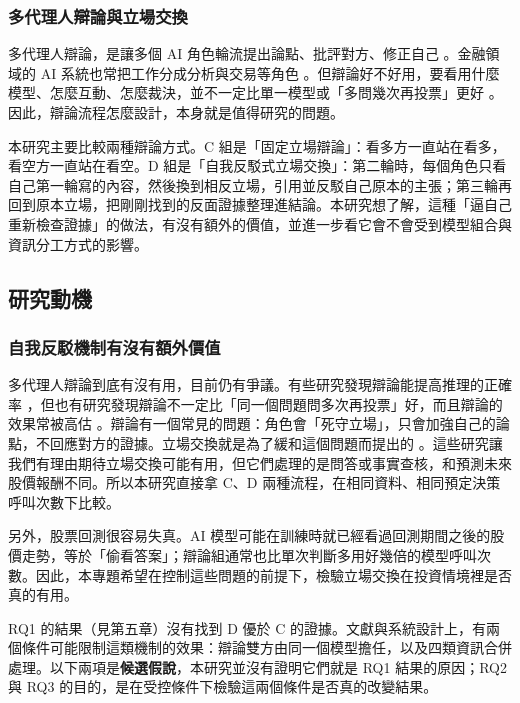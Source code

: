 \documentclass[12pt,a4paper]{article}
\numberwithin{table}{section}
\numberwithin{figure}{section}
\begin{document}
\subsubsection{多代理人辯論與立場交換}
多代理人辯論，是讓多個 AI 角色輪流提出論點、批評對方、修正自己 \citep{du2023debate,liang2023divergent}。金融領域的 AI 系統也常把工作分成分析與交易等角色 \citep{xiao2024tradingagents,zhang2024stockagent}。但辯論好不好用，要看用什麼模型、怎麼互動、怎麼裁決，並不一定比單一模型或「多問幾次再投票」更好 \citep{smit2023mad,zhang2025stop}。因此，辯論流程怎麼設計，本身就是值得研究的問題。

本研究主要比較兩種辯論方式。C 組是「固定立場辯論」：看多方一直站在看多，看空方一直站在看空。D 組是「自我反駁式立場交換」：第二輪時，每個角色只看自己第一輪寫的內容，然後換到相反立場，引用並反駁自己原本的主張；第三輪再回到原本立場，把剛剛找到的反面證據整理進結論。本研究想了解，這種「逼自己重新檢查證據」的做法，有沒有額外的價值，並進一步看它會不會受到模型組合與資訊分工方式的影響。

\subsection{研究動機}

\subsubsection{自我反駁機制有沒有額外價值}
多代理人辯論到底有沒有用，目前仍有爭議。有些研究發現辯論能提高推理的正確率 \citep{du2023debate}，但也有研究發現辯論不一定比「同一個問題問多次再投票」好，而且辯論的效果常被高估 \citep{smit2023mad,zhang2025stop}。辯論有一個常見的問題：角色會「死守立場」，只會加強自己的論點，不回應對方的證據。立場交換就是為了緩和這個問題而提出的 \citep{liu2025roleswitch,chowdhury2026proclaim}。這些研究讓我們有理由期待立場交換可能有用，但它們處理的是問答或事實查核，和預測未來股價報酬不同。所以本研究直接拿 C、D 兩種流程，在相同資料、相同預定決策呼叫次數下比較。

另外，股票回測很容易失真。AI 模型可能在訓練時就已經看過回測期間之後的股價走勢，等於「偷看答案」\citep{glasserman2023lookahead,kong2026bias}；辯論組通常也比單次判斷多用好幾倍的模型呼叫次數。因此，本專題希望在控制這些問題的前提下，檢驗立場交換在投資情境裡是否真的有用。

RQ1 的結果（見第五章）沒有找到 D 優於 C 的證據。文獻與系統設計上，有兩個條件可能限制這類機制的效果：辯論雙方由同一個模型擔任，以及四類資訊合併處理。以下兩項是\textbf{候選假說}，本研究並沒有證明它們就是 RQ1 結果的原因；RQ2 與 RQ3 的目的，是在受控條件下檢驗這兩個條件是否真的改變結果。
\end{document}
